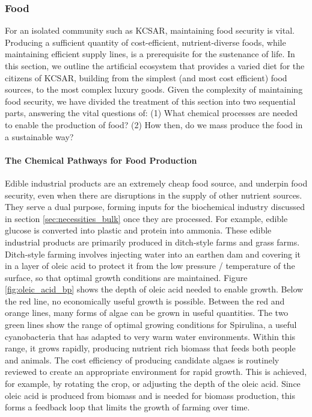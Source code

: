 \documentclass[fleqn,10pt]{Stylesheet} %
\begin{document}
\subsubsection{Food}
\label{sec:necessities_food}
 
For an isolated community such as KCSAR, maintaining food security is vital. Producing a sufficient quantity of cost-efficient, nutrient-diverse foods, while maintaining efficient supply lines, is a prerequisite for the sustenance of life. In this section, we outline the artificial ecosystem that provides a varied diet for the citizens of KCSAR, building from the simplest (and most cost efficient) food sources, to the most complex luxury goods. Given the complexity of maintaining food security, we have divided the treatment of this section into two sequential parts, answering the vital questions of: (1) What chemical processes are needed to enable the production of food? (2) How then, do we mass produce the food in a sustainable way?

\paragraph{The Chemical Pathways for Food Production}
Edible industrial products are an extremely cheap food source, and underpin food security, even when there are disruptions in the supply of other nutrient sources. They serve a dual purpose, forming inputs for the biochemical industry discussed in section \ref{sec:necessities_bulk} once they are processed. For example, edible glucose is converted into plastic and protein into ammonia. These edible industrial products are primarily produced in ditch-style farms and grass farms. Ditch-style farming involves injecting water into an earthen dam and covering it in a layer of oleic acid to protect it from the low pressure / temperature of the surface, so that optimal growth conditions are maintained. Figure \ref{fig:oleic_acid_bp} shows the depth of oleic acid needed to enable growth. Below the red line, no economically useful growth is possible. Between the red and orange lines, many forms of algae can be grown in useful quantities. The two green lines show the range of optimal growing conditions for Spirulina, a useful cyanobacteria that has adapted to very warm water environments. Within this range, it grows rapidly, producing nutrient rich biomass that feeds both people and animals. The cost efficiency of producing candidate algaes is routinely reviewed to create an appropriate environment for rapid growth. This is achieved, for example, by rotating the crop, or adjusting the depth of the oleic acid. Since oleic acid is produced from biomass and is needed for biomass production, this forms a feedback loop that limits the growth of farming over time.
\end{document}
